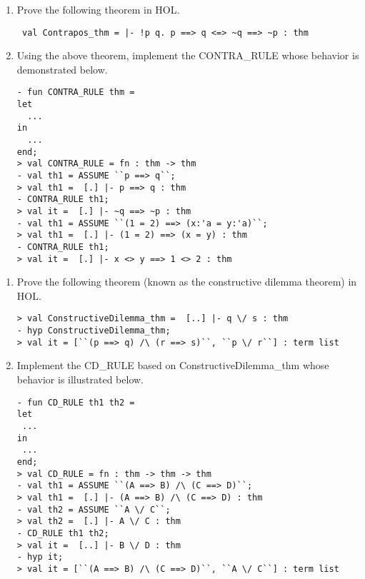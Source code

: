 \begin{exercise}
  \begin{enumerate}[{A.}]
\item Prove the following theorem in HOL.
  \begin{small}
\begin{verbatim}
 val Contrapos_thm = |- !p q. p ==> q <=> ~q ==> ~p : thm
\end{verbatim}
  \end{small}
\item Using the above theorem, implement the CONTRA\_RULE whose
  behavior is demonstrated below.
  \begin{small}
\begin{verbatim}
- fun CONTRA_RULE thm =
let
  ...
in
  ...
end;
> val CONTRA_RULE = fn : thm -> thm
- val th1 = ASSUME ``p ==> q``;
> val th1 =  [.] |- p ==> q : thm
- CONTRA_RULE th1;
> val it =  [.] |- ~q ==> ~p : thm
- val th1 = ASSUME ``(1 = 2) ==> (x:'a = y:'a)``;
> val th1 =  [.] |- (1 = 2) ==> (x = y) : thm
- CONTRA_RULE th1;
> val it =  [.] |- x <> y ==> 1 <> 2 : thm
\end{verbatim}
  \end{small}
\end{enumerate}

\end{exercise}

\begin{exercise}
  \begin{enumerate}[{A.}]
\item Prove the following theorem (known as the constructive dilemma
  theorem) in HOL.
  \begin{small}
\begin{verbatim}
> val ConstructiveDilemma_thm =  [..] |- q \/ s : thm
- hyp ConstructiveDilemma_thm;
> val it = [``(p ==> q) /\ (r ==> s)``, ``p \/ r``] : term list
\end{verbatim}
  \end{small}
\item Implement the CD\_RULE based on ConstructiveDilemma\_thm whose
  behavior is illustrated below.
  \begin{small}
\begin{verbatim}
- fun CD_RULE th1 th2 =
let 
 ...
in
 ...
end;
> val CD_RULE = fn : thm -> thm -> thm
- val th1 = ASSUME ``(A ==> B) /\ (C ==> D)``;
> val th1 =  [.] |- (A ==> B) /\ (C ==> D) : thm
- val th2 = ASSUME ``A \/ C``;
> val th2 =  [.] |- A \/ C : thm
- CD_RULE th1 th2;
> val it =  [..] |- B \/ D : thm
- hyp it;
> val it = [``(A ==> B) /\ (C ==> D)``, ``A \/ C``] : term list
\end{verbatim}
  \end{small}
\end{enumerate}

\end{exercise}

